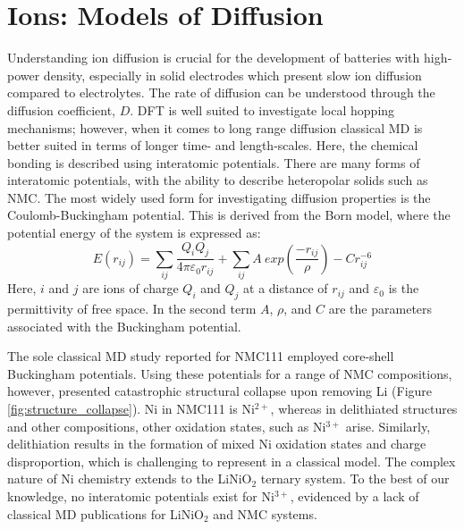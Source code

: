 \documentclass[journal=jacsat,manuscript=article]{achemso}
\begin{document}
\section*{Ions: Models of Diffusion}
Understanding ion diffusion is crucial for the development of batteries with high‐power density, especially in solid electrodes which present slow ion diffusion compared to electrolytes. 
The rate of diffusion can be understood through the diffusion coefficient, $D$. 
DFT is well suited to investigate local hopping mechanisms;\cite{van_der_ven_layered_2001, van_der_ven_LiTiS2_2008} however, when it comes to long range diffusion classical MD is better suited in terms of longer time- and length-scales. 
Here, the chemical bonding is described using interatomic potentials. 
There are many forms of interatomic potentials, with the ability to describe heteropolar solids such as NMC. 
The most widely used form for investigating diffusion properties is the Coulomb-Buckingham potential. \cite{buckingham_classical_1938} 
This is derived from the Born model\cite{born_1932, mayer_1932}, where the potential energy of the system is expressed as:
%
\begin{equation}
    E(r_{ij}) =  \sum_{ij} \frac{Q_i Q_j}{4\pi \varepsilon_0 r_{ij}} + \sum_{ij} A \ exp(\frac{-r_{ij}}{\rho}) - Cr_{ij}^{-6}
\end{equation}
%
Here, $i$ and $j$ are ions of charge $Q_i$ and $Q_j$ at a distance of $r_{ij}$ and $\varepsilon_0$ is the permittivity of free space. In the second term $A$, $\rho$, and $C$ are the parameters associated with the Buckingham potential.

The sole classical MD study reported for NMC111 employed core-shell Buckingham potentials. \cite{Lee_and_Park_2012}
Using these potentials for a range of NMC compositions, however, presented  catastrophic structural collapse upon removing Li (Figure \ref{fig:structure_collapse}). Ni in NMC111 is Ni$^{2+}$, whereas in delithiated structures and other compositions, other oxidation states, such as Ni$^{3+}$ arise. Similarly, delithiation results in the formation of mixed Ni oxidation states and charge disproportion, which is challenging to represent in a classical model. \cite{Nakamura_2019,Kim_2002,Alonso_1999} 
The complex nature of Ni chemistry extends to the LiNiO$_2$ ternary system. To the best of our knowledge, no interatomic potentials exist for Ni$^{3+}$, evidenced by a lack of classical MD publications for LiNiO$_2$ and NMC systems.
\end{document}
